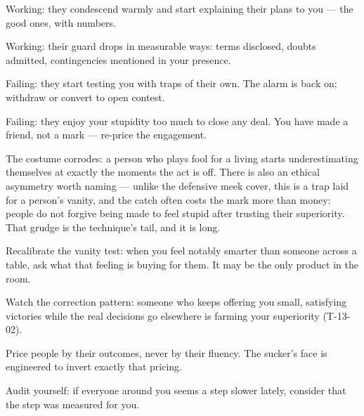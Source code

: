 \begin{feedback}
  \item Working: they condescend warmly and start explaining their plans to you --- the good ones, with numbers.
  \item Working: their guard drops in measurable ways: terms disclosed, doubts admitted, contingencies mentioned in your presence.
  \item Failing: they start testing you with traps of their own. The alarm is back on; withdraw or convert to open contest.
  \item Failing: they enjoy your stupidity too much to close any deal. You have made a friend, not a mark --- re-price the engagement.
\end{feedback}
\begin{failure}
The costume corrodes: a person who plays fool for a living starts underestimating themselves at exactly the moments the act is off. There is also an ethical asymmetry worth naming --- unlike the defensive meek cover, this is a trap laid for a person's vanity, and the catch often costs the mark more than money: people do not forgive being made to feel stupid after trusting their superiority. That grudge is the technique's tail, and it is long.
\end{failure}
\begin{countermeasures}
  \item Recalibrate the vanity test: when you feel notably smarter than someone across a table, ask what that feeling is buying for them. It may be the only product in the room.
  \item Watch the correction pattern: someone who keeps offering you small, satisfying victories while the real decisions go elsewhere is farming your superiority (T-13-02).
  \item Price people by their outcomes, never by their fluency. The sucker's face is engineered to invert exactly that pricing.
  \item Audit yourself: if everyone around you seems a step slower lately, consider that the step was measured for you.
\end{countermeasures}

\seesources
{}
